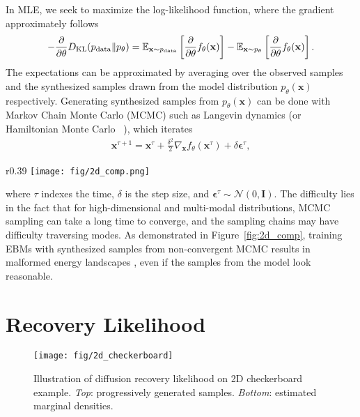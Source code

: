 \documentclass{article} \usepackage{iclr2021_conference,times}
\def\Figref#1{Figure~\ref{#1}}
\def\rvx{{\mathbf{x}}}
\def\mI{{\bm{I}}}
\newcommand{\pdata}{p_{\rm{data}}}
\newcommand{\E}{\mathbb{E}}
\newcommand{\KL}{D_{\mathrm{KL}}}
\def\N{{\mathcal N}}
\def\beps{\bm{\epsilon}}
\begin{document}
In MLE, we seek to maximize the log-likelihood function, where the gradient approximately follows~\citep{xie2016theory}
\begin{eqnarray}
	- \frac{\partial}{\partial \theta} \KL( \pdata \Vert p_\theta) = \E_{\rvx \sim \pdata}\left[\frac{\partial}{\partial \theta} f_\theta(\rvx) \right] - \E_{\rvx \sim p_\theta}\left[\frac{\partial}{\partial \theta} f_\theta(\rvx) \right]. \label{eqn: mle_learning}
\end{eqnarray}
The expectations can be approximated by averaging over the observed samples and the synthesized samples drawn from the model distribution $p_\theta(\rvx)$ respectively. Generating synthesized samples from $p_\theta(\rvx)$ can be done with Markov Chain Monte Carlo (MCMC) such as Langevin dynamics (or Hamiltonian Monte Carlo ~\citep{girolami2011riemann}), which iterates
\begin{eqnarray}
	\rvx^{\tau + 1} = \rvx^\tau + \frac{\delta^2}{2} \nabla_\rvx f_\theta(\rvx^\tau) + \delta \beps^\tau,
\end{eqnarray}
\begin{wrapfigure}{r}{0.39\linewidth}
\centering
\texttt{[image: fig/2d\_comp.png]}
\caption{Comparison of learning EBMs by diffusion recovery likelihood (Ours) versus marginal likelihood (Short-run).}
\vspace{-.7cm}
\label{fig:2d_comp}
\end{wrapfigure}
where $\tau$ indexes the time, $\delta$ is the step size, and $\beps^\tau \sim \N(0, \mI)$. The difficulty lies in the fact that for high-dimensional and multi-modal distributions, MCMC sampling can take a long time to converge, and the sampling chains may have difficulty traversing modes. As demonstrated in \Figref{fig:2d_comp}, training EBMs with synthesized samples from non-convergent MCMC results in malformed energy landscapes \citep{nijkamp2019learning}, even if the samples from the model look reasonable.  
\section{Recovery Likelihood}
\begin{figure}[t]
\begin{center}
\texttt{[image: fig/2d\_checkerboard]}
\end{center}
\caption{Illustration of diffusion recovery likelihood on 2D checkerboard example. {\em Top}: progressively generated samples. {\em Bottom}: estimated marginal densities. }
\label{fig:2d}
\end{figure}
\end{document}
